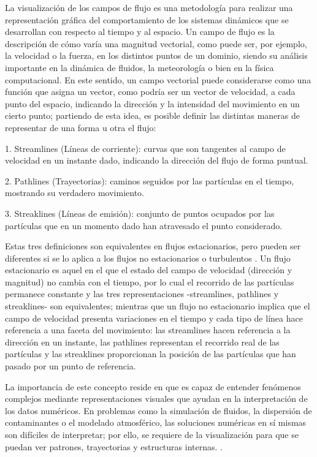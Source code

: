 \documentclass[12pt]{article}
\begin{document}
La visualización de los campos de flujo es una metodología para realizar una representación gráfica del comportamiento de los sistemas dinámicos que se desarrollan con respecto al tiempo y al espacio. Un campo de flujo es la descripción de cómo varía una magnitud vectorial, como puede ser, por ejemplo, la velocidad o la fuerza, en los distintos puntos de un dominio, siendo su análisis importante en la dinámica de fluidos, la meteorología o bien en la física computacional.
En este sentido, un campo vectorial puede considerarse como una función que asigna un vector, como podría ser un vector de velocidad, a cada punto del espacio, indicando la dirección y la intensidad del movimiento en un cierto punto; partiendo de esta idea, es posible definir las distintas maneras de representar de una forma u otra el flujo:

1. Streamlines (Líneas de corriente): curvas que son tangentes al campo de velocidad en un instante dado, indicando la dirección del flujo de forma puntual.

2. Pathlines (Trayectorias): caminos seguidos por las partículas en el tiempo, mostrando su verdadero movimiento.

3. Streaklines (Líneas de emisión): conjunto de puntos ocupados por las partículas que en un momento dado han atravesado el punto considerado.

Estas tres definiciones son equivalentes en flujos estacionarios, pero pueden ser diferentes si se lo aplica a los flujos no estacionarios o turbulentos \cite{hansen_visualization_2005}. Un flujo estacionario es aquel en el que el estado del campo de velocidad (dirección y magnitud) no cambia con el tiempo, por lo cual el recorrido de las partículas permanece constante y las tres representaciones -streamlines, pathlines y streaklines- son equivalentes; mientras que un flujo no estacionario implica que el campo de velocidad presenta variaciones en el tiempo y cada tipo de línea hace referencia a una faceta del movimiento: las streamlines hacen referencia a la dirección en un instante, las pathlines representan el recorrido real de las partículas y las streaklines proporcionan la posición de las partículas que han pasado por un punto de referencia.

La importancia de este concepto reside en que es capaz de entender fenómenos complejos mediante representaciones visuales que ayudan en la interpretación de los datos numéricos. En problemas como la simulación de fluidos, la dispersión de contaminantes o el modelado atmosférico, las soluciones numéricas en sí mismas son difíciles de interpretar; por ello, se requiere de la visualización para que se puedan ver patrones, trayectorias y estructuras internas. \cite{laramee_state_2004}.
\end{document}
